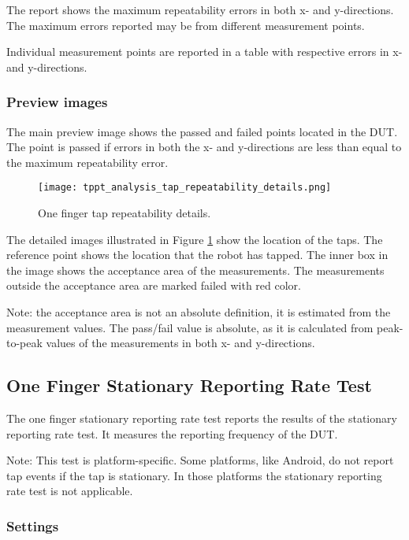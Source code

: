 The report shows the maximum repeatability errors in both x- and y-directions. The maximum errors reported may be from different measurement points. 

Individual measurement points are reported in a table with respective errors in x- and y-directions.

\subsubsection{Preview images}

The main preview image shows the passed and failed points located in the DUT. The point is passed if errors in both the x- and y-directions are less than equal to the maximum repeatability error.

\begin{figure}[!h]
	\centering
	\texttt{[image: tppt\_analysis\_tap\_repeatability\_details.png]}
	\caption{One finger tap repeatability details.}
	\label{fig:tppt_analysis_tap_repeatability_details}
\end{figure}

The detailed images illustrated in Figure \ref{fig:tppt_analysis_tap_repeatability_details} show the location of the taps. The reference point shows the location that the robot has tapped. The inner box in the image shows the acceptance area of the measurements. The measurements outside the acceptance area are marked failed with red color. 

Note: the acceptance area is not an absolute definition, it is estimated from the measurement values. The pass/fail value is absolute, as it is calculated from peak-to-peak values of the measurements in both x- and y-directions.

\subsection{One Finger Stationary Reporting Rate Test}

The one finger stationary reporting rate test reports the results of the stationary reporting rate test. It measures the reporting frequency of the DUT.

Note: This test is platform-specific. Some platforms, like Android, do not report tap events if the tap is stationary. In those platforms the stationary reporting rate test is not applicable.

\subsubsection{Settings}

